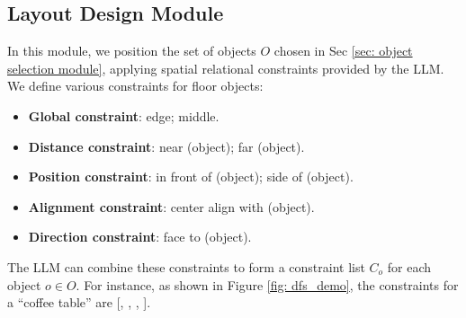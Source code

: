 \subsection{Layout Design Module} \label{sec: object placement module}
In this module, we position the set of objects $O$ chosen in Sec \ref{sec: object selection module}, applying spatial relational constraints provided by the LLM. We define various constraints for floor objects:
\begin{itemize}
    \item \textbf{Global constraint}: edge; middle.
    \item \textbf{Distance constraint}: near (object); far (object).
    \item \textbf{Position constraint}: in front of (object); side of (object).
    \item \textbf{Alignment constraint}: center align with (object).
    \item \textbf{Direction constraint}: face to (object).
\end{itemize}

The LLM can combine these constraints to form a constraint list $C_o$ for each object $o \in O$. For instance, as shown in Figure \ref{fig: dfs_demo}, the constraints for a ``coffee table'' are [, , , ].

